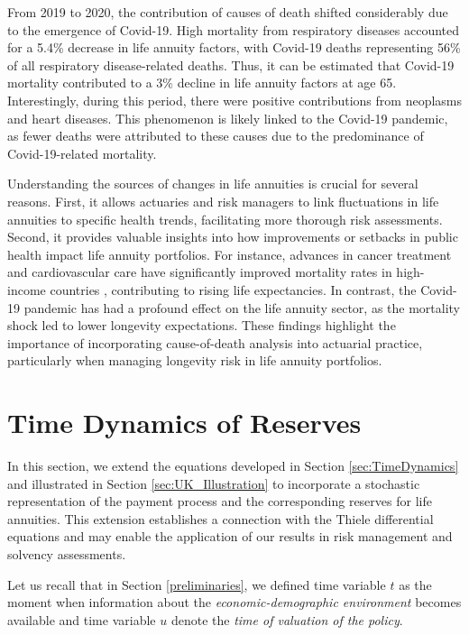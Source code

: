 \documentclass[12pt]{article}
\begin{document}
From 2019 to 2020, the contribution of causes of death shifted considerably due to the emergence of Covid-19. High mortality from respiratory diseases accounted for a 5.4\% decrease in life annuity factors, with Covid-19 deaths representing 56\% of all respiratory disease-related deaths. Thus, it can be estimated that Covid-19 mortality contributed to a 3\% decline in life annuity factors at age 65. Interestingly, during this period, there were positive contributions from neoplasms and heart diseases. This phenomenon is likely linked to the Covid-19 pandemic, as fewer deaths were attributed to these causes due to the predominance of Covid-19-related mortality.

Understanding the sources of changes in life annuities is crucial for several reasons. First, it allows actuaries and risk managers to link fluctuations in life annuities to specific health trends, facilitating more thorough risk assessments. Second, it provides valuable insights into how improvements or setbacks in public health impact life annuity portfolios. For instance, advances in cancer treatment and cardiovascular care have significantly improved mortality rates in high-income countries \citep{weber2023gains}, contributing to rising life expectancies. In contrast, the Covid-19 pandemic has had a profound effect on the life annuity sector, as the mortality shock led to lower longevity expectations. These findings highlight the importance of incorporating cause-of-death analysis into actuarial practice, particularly when managing longevity risk in life annuity portfolios.


\FloatBarrier
\section{Time Dynamics of Reserves}\label{sec:Reserves}

In this section, we extend the equations developed in Section \ref{sec:TimeDynamics} and illustrated in Section \ref{sec:UK_Illustration} to incorporate a stochastic representation of the payment process and the corresponding reserves for life annuities. This extension establishes a connection with the Thiele differential equations and may enable the application of our results in risk management and solvency assessments.

Let us recall that in Section \ref{preliminaries}, we defined time variable \(t\) as the moment when information about the \textit{economic-demographic environment} becomes available and time variable \(u\) denote the \textit{time of valuation of the policy}. 
\end{document}
